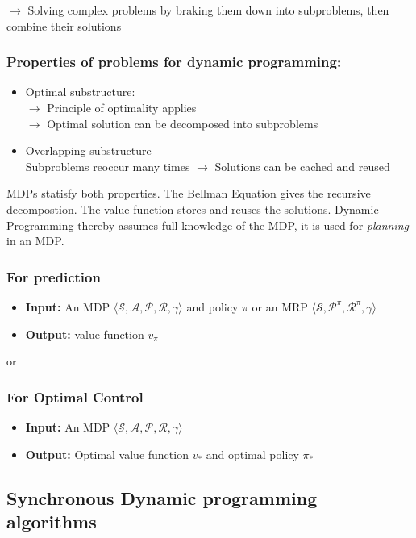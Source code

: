 \documentclass[10pt]{article}
\begin{document}
$\rightarrow$ Solving complex problems by braking them down into subproblems, then combine their solutions

\subsubsection*{Properties of problems for dynamic programming:}
\begin{itemize}
\item Optimal substructure: \\
$\rightarrow$ Principle of optimality applies \\
$\rightarrow$ Optimal solution can be decomposed into subproblems
\item Overlapping substructure \\
Subproblems reoccur many times $\rightarrow$ Solutions can be cached and reused
\end{itemize}

MDPs statisfy both properties. The Bellman Equation gives the recursive decompostion. The value function stores and reuses the solutions. Dynamic Programming thereby assumes full knowledge of the MDP, it is used for \textit{planning} in an MDP.

\subsubsection*{For prediction}
\begin{itemize}
\item \textbf{Input:} An MDP $\langle \mathcal{S,A,P,R,\gamma} \rangle$ and policy $\pi$ or an MRP $\langle \mathcal{S,P^{\pi},R^{\pi},\gamma} \rangle$ 
\item \textbf{Output:} value function $v_{\pi}$
\end{itemize}
or
\subsubsection*{For Optimal Control}
\begin{itemize}
\item \textbf{Input:} An MDP $\langle \mathcal{S,A,P,R,\gamma} \rangle$ 
\item \textbf{Output:} Optimal value function $v_{*}$ and optimal policy $\pi_{*}$
\end{itemize}

\subsection{Synchronous Dynamic programming algorithms}
\end{document}
